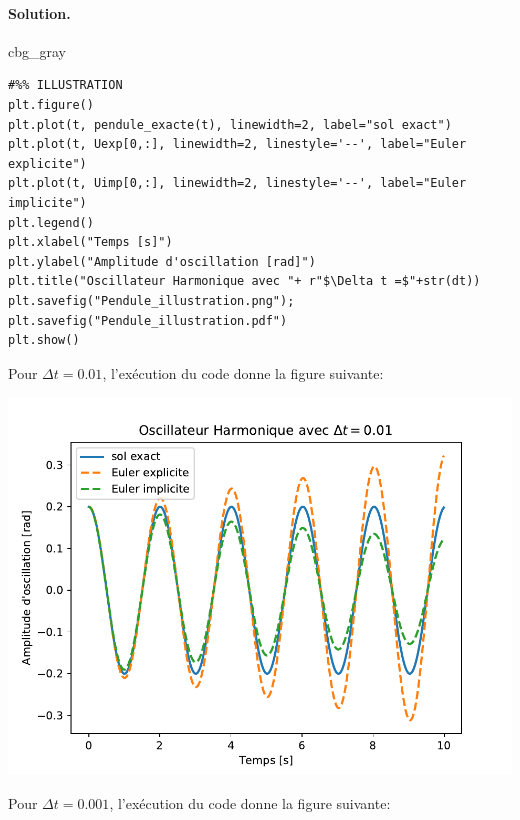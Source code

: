 \documentclass[%
oneside,                 %
final,                   %
10pt,french]{article}
\newenvironment{_cod_tight}[1]{
   \def\FrameCommand{\colorbox{#1}}
   \FrameRule0.6pt\MakeFramed {\FrameRestore}\vskip3mm}
   {\vskip0mm\endMakeFramed}
\newenvironment{cod}[1]{
\bgroup\rmfamily
\fboxsep=0mm\relax
\begin{_cod_tight}{#1}
\list{}{\parsep=-2mm\parskip=0mm\topsep=0pt\leftmargin=2mm
\rightmargin=2\leftmargin\leftmargin=4pt\relax}
\item\relax}
{\endlist\end{_cod_tight}\egroup}
\newenvironment{doconceexercise}{}{}
\begin{document}
\begin{doconceexercise}
\paragraph{Solution.}
\begin{cod}{cbg_gray}\begin{verbatim}
#%% ILLUSTRATION
plt.figure()
plt.plot(t, pendule_exacte(t), linewidth=2, label="sol exact")
plt.plot(t, Uexp[0,:], linewidth=2, linestyle='--', label="Euler explicite")
plt.plot(t, Uimp[0,:], linewidth=2, linestyle='--', label="Euler implicite")
plt.legend()
plt.xlabel("Temps [s]")
plt.ylabel("Amplitude d'oscillation [rad]")
plt.title("Oscillateur Harmonique avec "+ r"$\Delta t =$"+str(dt))
plt.savefig("Pendule_illustration.png"); plt.savefig("Pendule_illustration.pdf")
plt.show()
\end{verbatim}
\end{cod}
\noindent

Pour $\Delta t = 0.01$, l'exécution du code donne la figure suivante:



\vspace{6mm}

\centerline{\includegraphics[width=0.7\linewidth]{scripts/Pendule_illustration.pdf}}

\vspace{6mm}



Pour $\Delta t = 0.001$, l'exécution du code donne la figure suivante:



\vspace{6mm}


\end{doconceexercise}
\end{document}

